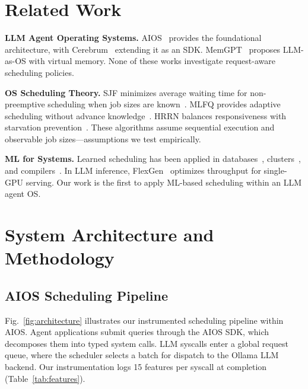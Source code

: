 \documentclass[conference]{IEEEtran}
\begin{document}
\section{Related Work}

\textbf{LLM Agent Operating Systems.}
AIOS~\cite{mei2025aios} provides the foundational architecture, with Cerebrum~\cite{rama2025cerebrum} extending it as an SDK. MemGPT~\cite{packer2023memgpt} proposes LLM-as-OS with virtual memory. None of these works investigate request-aware scheduling policies.

\textbf{OS Scheduling Theory.}
SJF minimizes average waiting time for non-preemptive scheduling when job sizes are known~\cite{liu1973scheduling}. MLFQ provides adaptive scheduling without advance knowledge~\cite{corbato1962experimental}. HRRN balances responsiveness with starvation prevention~\cite{silberschatz2018os}. These algorithms assume sequential execution and observable job sizes---assumptions we test empirically.

\textbf{ML for Systems.}
Learned scheduling has been applied in databases~\cite{kraska2018case}, clusters~\cite{mao2019learning}, and compilers~\cite{chen2018tvm}. In LLM inference, FlexGen~\cite{sheng2023flexgen} optimizes throughput for single-GPU serving. Our work is the first to apply ML-based scheduling within an LLM agent OS.

\section{System Architecture and Methodology}

\subsection{AIOS Scheduling Pipeline}

Fig.~\ref{fig:architecture} illustrates our instrumented scheduling pipeline within AIOS. Agent applications submit queries through the AIOS SDK, which decomposes them into typed system calls. LLM syscalls enter a global request queue, where the scheduler selects a batch for dispatch to the Ollama LLM backend. Our instrumentation logs 15 features per syscall at completion (Table~\ref{tab:features}).
\end{document}
